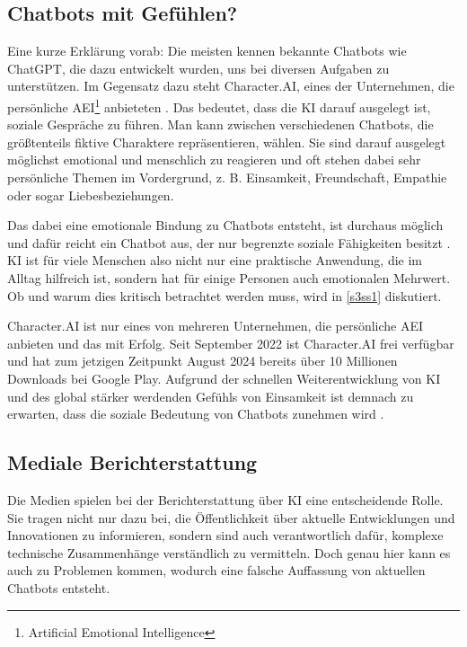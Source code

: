	\subsection{Chatbots mit Gefühlen?}\label{s1ss1}
	Eine kurze Erklärung vorab: Die meisten kennen bekannte Chatbots wie ChatGPT, die dazu
	entwickelt wurden, uns bei diversen Aufgaben zu unterstützen. Im Gegensatz dazu steht Character.AI, 
	eines der Unternehmen, die \glqq{}persönliche\grqq{} AEI\footnote{Artificial Emotional Intelligence} 
	anbieteten \cite{cAI24}. Das bedeutet, dass die KI darauf ausgelegt ist, soziale Gespräche zu führen.
	Man kann zwischen verschiedenen Chatbots, die größtenteils fiktive Charaktere repräsentieren, wählen. Sie
	sind darauf ausgelegt möglichst emotional und menschlich zu reagieren und oft stehen dabei sehr 
	persönliche Themen im Vordergrund, z. B. Einsamkeit, Freundschaft, Empathie oder sogar Liebesbeziehungen. 
	
	Das dabei eine emotionale Bindung zu Chatbots entsteht, ist durchaus möglich und dafür reicht ein 
	Chatbot aus, der nur begrenzte soziale Fähigkeiten besitzt \cite{chen24}. KI ist für viele Menschen also 
	nicht nur eine praktische Anwendung, die im Alltag hilfreich ist, sondern hat für einige Personen auch
	emotionalen Mehrwert. Ob und warum dies kritisch betrachtet werden muss, wird in \ref{s3ss1} diskutiert.  

	Character.AI ist nur eines von mehreren Unternehmen, die persönliche AEI anbieten und das mit Erfolg. 
	Seit September 2022 ist Character.AI frei verfügbar und hat zum jetzigen Zeitpunkt August 2024 bereits
	über 10 Millionen Downloads bei Google Play. Aufgrund der schnellen Weiterentwicklung von KI und des 
	global stärker werdenden Gefühls von Einsamkeit ist demnach zu erwarten, dass die soziale Bedeutung 
	von Chatbots zunehmen wird \cite{chen24}. 
	
	
	\clearpage		
	\subsection{Mediale Berichterstattung}\label{s1ss2}
	Die Medien spielen bei der Berichterstattung über KI eine entscheidende Rolle. Sie tragen nicht nur dazu
	bei, die Öffentlichkeit über aktuelle Entwicklungen und Innovationen zu informieren, sondern sind auch 
	verantwortlich dafür, komplexe technische Zusammenhänge verständlich zu vermitteln. Doch genau hier kann
	es auch zu Problemen kommen, wodurch eine falsche Auffassung von aktuellen Chatbots entsteht.

